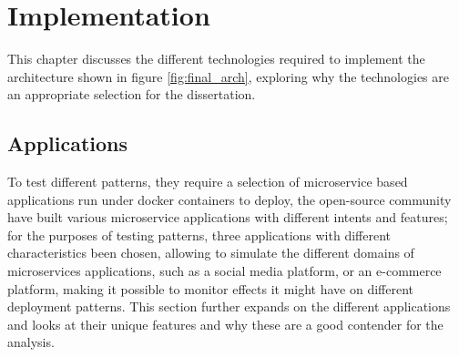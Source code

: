 
% 
\chapter{Implementation}
This chapter discusses the different technologies required to implement the architecture shown in figure \ref{fig:final_arch}, exploring why the technologies are an appropriate selection for the dissertation. 

\section{Applications}
To test different patterns, they require a selection of microservice based applications run under docker containers to deploy, the open-source community have built various microservice applications with different intents and features; for the purposes of testing patterns, three applications with different characteristics been chosen, allowing to simulate the different domains of microservices applications, such as a social media platform, or an e-commerce platform, making it possible to monitor effects it might have on different deployment patterns. This section further expands on the different applications and looks at their unique features and why these are a good contender for the analysis. 
